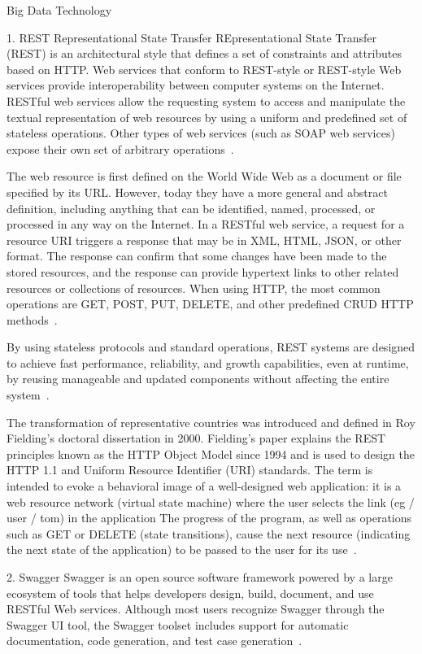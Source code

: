 Big Data Technology

1. REST Representational State Transfer
REpresentational State Transfer (REST) is an architectural style 
that defines a set of constraints and attributes based on HTTP. 
Web services that conform to REST-style or REST-style Web 
services provide interoperability between computer systems on the 
Internet. RESTful web services allow the requesting system to 
access and manipulate the textual representation of web resources 
by using a uniform and predefined set of stateless operations. 
Other types of web services (such as SOAP web services) expose 
their own set of arbitrary operations~\cite{editor08}.

The web resource is first defined on the World Wide Web as a 
document or file specified by its URL. However, today they have a 
more general and abstract definition, including anything that can 
be identified, named, processed, or processed in any way on the 
Internet. In a RESTful web service, a request for a resource URI 
triggers a response that may be in XML, HTML, JSON, or other 
format. The response can confirm that some changes have been made 
to the stored resources, and the response can provide hypertext 
links to other related resources or collections of resources. 
When using HTTP, the most common operations are GET, POST, PUT, 
DELETE, and other predefined CRUD HTTP methods~\cite{editor08}.

By using stateless protocols and standard operations, REST 
systems are designed to achieve fast performance, reliability, 
and growth capabilities, even at runtime, by reusing manageable 
and updated components without affecting the entire system~\cite{editor08}.

The transformation of representative countries was introduced and 
defined in Roy Fielding's doctoral dissertation in 2000. 
Fielding's paper explains the REST principles known as the HTTP 
Object Model since 1994 and is used to design the HTTP 1.1 and 
Uniform Resource Identifier (URI) standards. The term is intended 
to evoke a behavioral image of a well-designed web application: it
 is a web resource network (virtual state machine) where the user 
selects the link (eg / user / tom) in the application The progress
 of the program, as well as operations such as GET or DELETE 
(state transitions), cause the next resource (indicating the next 
state of the application) to be passed to the user for its use~\cite{editor08}.

2. Swagger
Swagger is an open source software framework powered by a large 
ecosystem of tools that helps developers design, build, document, 
and use RESTful Web services. Although most users recognize Swagger
 through the Swagger UI tool, the Swagger toolset includes support
 for automatic documentation, code generation, and test case 
generation~\cite{editor09}.

